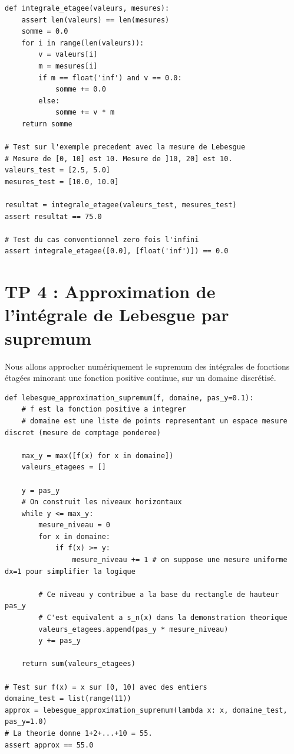 \documentclass[11pt,a4paper]{article}
\begin{document}
\begin{lstlisting}
def integrale_etagee(valeurs, mesures):
    assert len(valeurs) == len(mesures)
    somme = 0.0
    for i in range(len(valeurs)):
        v = valeurs[i]
        m = mesures[i]
        if m == float('inf') and v == 0.0:
            somme += 0.0
        else:
            somme += v * m
    return somme

# Test sur l'exemple precedent avec la mesure de Lebesgue
# Mesure de [0, 10] est 10. Mesure de ]10, 20] est 10.
valeurs_test = [2.5, 5.0]
mesures_test = [10.0, 10.0]

resultat = integrale_etagee(valeurs_test, mesures_test)
assert resultat == 75.0

# Test du cas conventionnel zero fois l'infini
assert integrale_etagee([0.0], [float('inf')]) == 0.0
\end{lstlisting}


\section{TP 4 : Approximation de l'intégrale de Lebesgue par supremum}

Nous allons approcher numériquement le supremum des intégrales de fonctions étagées minorant une fonction positive continue, sur un domaine discrétisé.

\begin{lstlisting}
def lebesgue_approximation_supremum(f, domaine, pas_y=0.1):
    # f est la fonction positive a integrer
    # domaine est une liste de points representant un espace mesure discret (mesure de comptage ponderee)

    max_y = max([f(x) for x in domaine])
    valeurs_etagees = []

    y = pas_y
    # On construit les niveaux horizontaux
    while y <= max_y:
        mesure_niveau = 0
        for x in domaine:
            if f(x) >= y:
                mesure_niveau += 1 # on suppose une mesure uniforme dx=1 pour simplifier la logique

        # Ce niveau y contribue a la base du rectangle de hauteur pas_y
        # C'est equivalent a s_n(x) dans la demonstration theorique
        valeurs_etagees.append(pas_y * mesure_niveau)
        y += pas_y

    return sum(valeurs_etagees)

# Test sur f(x) = x sur [0, 10] avec des entiers
domaine_test = list(range(11))
approx = lebesgue_approximation_supremum(lambda x: x, domaine_test, pas_y=1.0)
# La theorie donne 1+2+...+10 = 55.
assert approx == 55.0
\end{lstlisting}
\end{document}
